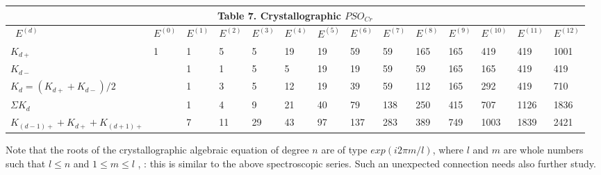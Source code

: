 \documentclass[a4paper,9pt]{article}
\begin{document}
\begin{table}
\label{tab:10:table10}
  \hskip-0.0cm\begin{tabular}{llllllllllllll}
    \toprule
    \multicolumn{14}{c}{Table 7. Crystallographic $PSO_{Cr}$}                  \\
    \cmidrule(r){1-14}
    \midrule
    
     
     
      
      \ $E^{(d)}$ & $E^{(0)}$ & $E^{(1)} $ & $E^{(2)}$ & $E^{(3)} $& $E^{(4)}$ &$ E^{(5)}$ &$ E^{(6)} $&$ E^{(7)}$ &$ E^{(8)}$ & $E^{(9)}$ &$ E^{(10)} $&$ E^{(11)} $&$ E^{(12)}$ \\
    \midrule
    $K_{d+}$  & 1 & 1 & 5 & 5 & 19 & 19 & 59 & 59 & 165 & 165 & 419 & 419 & 1001 \\
    
     $K_{d-}$  &  & 1 & 1 & 5 & 5 & 19 & 19 & 59 & 59 & 165 & 165& 419 & 419 \\
     
      $K_{d} = (K_{d+} + K_{d-})/2$  & & 1 & 3 & 5 & 12 & 19 & 39 & 59 & 112 & 165 & 292 & 419 & 710 \\
      
      $\Sigma K_{d}$ &  & 1 & 4 & 9 & 21 & 40 & 79 & 138 & 250 & 415 & 707 & 1126 & 1836 \\
      
      $K_{(d-1)+} +K_{d+}+ K_{(d+1)+}$  &  & 7 & 11 & 29 & 43 & 97 & 137 & 283 & 389 & 749 & 1003 & 1839 & 2421 \\

      

    \bottomrule
  \end{tabular}
\end{table}
    
    Note that the roots of the crystallographic algebraic equation of degree $n$ are of type $exp(i2\pi m/l)$, where $l$ and $m$ are whole numbers such that $ l \leq n $ and $ 1 \leq m \leq l $ ,  : this is similar to the above spectroscopic series. Such an unexpected connection needs also further study.   
\end{document}
